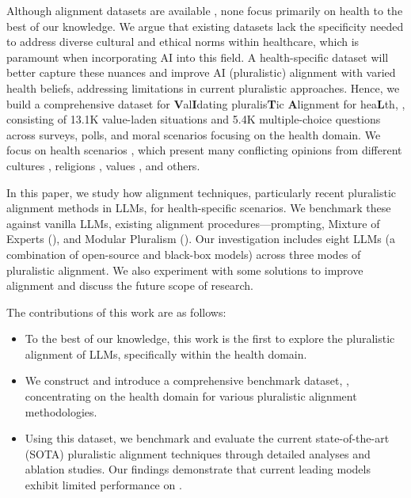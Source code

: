 Although alignment datasets are available \citep{santurkar2023whose,sorensen2024value}, none focus primarily on health to the best of our knowledge. We argue that existing datasets lack the specificity needed to address diverse cultural and ethical norms within healthcare, which is paramount when incorporating AI into this field. A health-specific dataset will better capture these nuances and improve AI (pluralistic) alignment with varied health beliefs, addressing limitations in current pluralistic approaches. Hence, we build a comprehensive dataset for \textbf{V}al\textbf{I}dating pluralis\textbf{T}ic \textbf{A}lignment for hea\textbf{L}th, \ourdataset, consisting of 13.1K value-laden situations and 5.4K multiple-choice questions across surveys, polls, and moral scenarios focusing on the health domain. We focus on health scenarios \citep{porter2010value}, which present many conflicting opinions from different cultures \citep{thomas2004health,kreuter2004role}, religions \citep{elmahjub2023artificial}, values \citep{klessig1992effect,de2000sensitivity}, and others.

In this paper, we study how alignment techniques, particularly recent pluralistic alignment methods \citep{feng2024modular} in LLMs, for health-specific scenarios. We benchmark these against vanilla LLMs, existing alignment procedures—prompting, Mixture of Experts (\moe), and Modular Pluralism (\modplural). Our investigation includes eight LLMs (a combination of open-source and black-box models) across three modes of pluralistic alignment. We also experiment with some solutions to improve alignment and discuss the future scope of research. 

The contributions of this work are as follows:
\begin{itemize}
    \item To the best of our knowledge, this work is the first to explore the pluralistic alignment of LLMs, specifically within the health domain.
    \item We construct and introduce a comprehensive benchmark dataset, \ourdataset, concentrating on the health domain for various pluralistic alignment methodologies.
    \item Using this dataset, we benchmark and evaluate the current state-of-the-art (SOTA) pluralistic alignment techniques through detailed analyses and ablation studies. Our findings demonstrate that current leading models exhibit limited performance on \ourdataset. 
    
\end{itemize}



